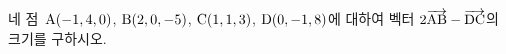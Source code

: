 네 점~$\mathrm{A}(-1{,}\mkern3mu\mathopen{}4{,}\mkern3mu\mathopen{}0)$, $\mathrm{B}(2{,}\mkern3mu\mathopen{}0{,}\mkern3mu\mathopen{}-5)$, $\mathrm{C}(1{,}\mkern3mu\mathopen{}1{,}\mkern3mu\mathopen{}3)$, $\mathrm{D}(0{,}\mkern3mu\mathopen{}-1{,}\mkern3mu\mathopen{}8)$에 대하여 벡터 $2\overrightarrow{\mathrm{AB}}-\overrightarrow{\mathrm{DC}}$의 크기를 구하시오.
